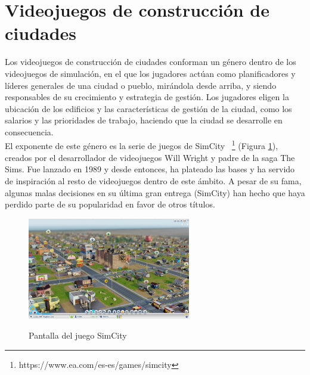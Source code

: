 \section{Videojuegos de construcción de ciudades}

Los videojuegos de construcción de ciudades conforman un género dentro de los videojuegos de simulación, en el que los jugadores actúan como planificadores y líderes generales de una ciudad o pueblo, mirándola desde arriba, y siendo responsables de su crecimiento y estrategia de gestión. Los jugadores eligen la ubicación de los edificios y las características de gestión de la ciudad, como los salarios y las prioridades de trabajo, haciendo que la ciudad se desarrolle en consecuencia. \\

El exponente de este género es la serie de juegos de SimCity\texttrademark~ \footnote{https://www.ea.com/es-es/games/simcity} (Figura \ref{fig:simcity}), creados por el desarrollador de videojuegos Will Wright y padre de la saga The Sims\texttrademark. Fue lanzado en 1989 y desde entonces, ha plateado las bases y ha servido de inspiración al resto de videojuegos dentro de este ámbito. A pesar de su fama, algunas malas decisiones en su última gran entrega (SimCity\texttrademark\xspace 2013) han hecho que haya perdido parte de su popularidad en favor de otros títulos. \\

\begin{figure}[h]
	\centering
	\includegraphics[height=12em]{images/SimCity}
	\label{fig:simcity}
	\caption{Pantalla del juego SimCity\texttrademark}
\end{figure}

\newpage

